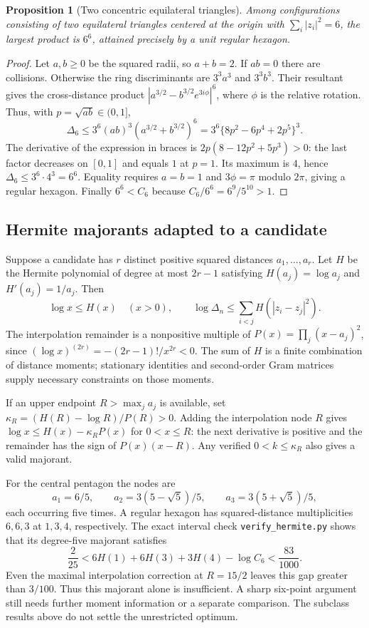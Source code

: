\documentclass[11pt]{article}
\newtheorem{proposition}[theorem]{Proposition}
\theoremstyle{remark}
\numberwithin{equation}{section}
\begin{document}
\begin{proposition}[Two concentric equilateral triangles]
Among configurations consisting of two equilateral triangles centered
at the origin with $\sum_i|z_i|^2=6$, the largest product is $6^6$,
attained precisely by a unit regular hexagon.
\end{proposition}
\begin{proof}
Let $a,b\ge0$ be the squared radii, so $a+b=2$.
If $ab=0$ there are collisions. Otherwise the ring discriminants are
$3^3a^3$ and $3^3b^3$. Their resultant gives the cross-distance product
$|a^{3/2}-b^{3/2}e^{3i\phi}|^6$, where $\phi$ is the relative rotation.
Thus, with $p=\sqrt{ab}\in(0,1]$,
\[
 \Delta_6\le3^6(ab)^3(a^{3/2}+b^{3/2})^6
 =3^6\{8p^2-6p^4+2p^5\}^3.
\]
The derivative of the expression in braces is
$2p(8-12p^2+5p^3)>0$: the last factor decreases on $[0,1]$
and equals $1$ at $p=1$. Its maximum is $4$, hence
$\Delta_6\le3^6\cdot4^3=6^6$.
Equality requires $a=b=1$ and $3\phi=\pi$ modulo $2\pi$,
giving a regular hexagon. Finally $6^6<C_6$ because
$C_6/6^6=6^9/5^{10}>1$.
\end{proof}

\subsection{Hermite majorants adapted to a candidate}
Suppose a candidate has $r$ distinct positive squared distances
$a_1,\ldots,a_r$. Let $H$ be the Hermite polynomial of degree at
most $2r-1$ satisfying $H(a_j)=\log a_j$ and $H'(a_j)=1/a_j$.
Then
\[
 \log x\le H(x)\quad(x>0),\qquad
 \log\Delta_n\le\sum_{i<j}H(|z_i-z_j|^2).
\]
The interpolation remainder is a nonpositive multiple of
$P(x)=\prod_j(x-a_j)^2$, since
$(\log x)^{(2r)}=-(2r-1)!/x^{2r}<0$.
The sum of $H$ is a finite combination of distance moments;
stationary identities and second-order Gram matrices supply
necessary constraints on those moments.

If an upper endpoint $R>\max_j a_j$ is available, set
$\kappa_R=(H(R)-\log R)/P(R)>0$.
Adding the interpolation node $R$ gives
$\log x\le H(x)-\kappa_RP(x)$ for $0<x\le R$:
the next derivative is positive and the remainder has the sign of
$P(x)(x-R)$. Any verified $0<k\le\kappa_R$ also gives a valid majorant.

For the central pentagon the nodes are
\[
 a_1=6/5,\qquad
 a_2=3(5-\sqrt5)/5,\qquad a_3=3(5+\sqrt5)/5,
\]
each occurring five times.
A regular hexagon has squared-distance multiplicities $6,6,3$ at
$1,3,4$, respectively. The exact interval check
\texttt{verify\_hermite.py} shows that its degree-five majorant satisfies
\[
 \frac2{25}<6H(1)+6H(3)+3H(4)-\log C_6<\frac{83}{1000}.
\]
Even the maximal interpolation correction at $R=15/2$ leaves
this gap greater than $3/100$.
Thus this majorant alone is insufficient. A sharp six-point argument
still needs further moment information or a separate comparison.
The subclass results above do not settle the unrestricted optimum.
\end{document}
